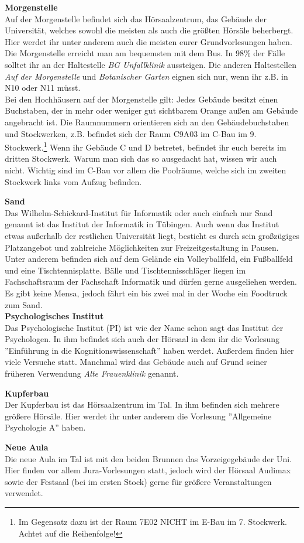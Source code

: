 \textbf{Morgenstelle}\\
Auf der Morgenstelle befindet sich das Hörsaalzentrum, das Gebäude der Universität, welches sowohl die meisten als auch die größten Hörsäle beherbergt. Hier werdet ihr unter anderem auch die meisten eurer Grundvorlesungen haben.\\
Die Morgenstelle erreicht man am bequemsten mit dem Bus. In 98\% der Fälle solltet ihr an der Haltestelle \emph{BG Unfallklinik} aussteigen. Die anderen Haltestellen \emph{Auf der Morgenstelle} und \emph{Botanischer Garten} eignen sich nur, wenn ihr z.B. in N10 oder N11 müsst.\\ Bei den Hochhäusern auf der Morgenstelle gilt: Jedes Gebäude besitzt einen Buchstaben, der in mehr oder weniger gut sichtbarem Orange außen am Gebäude angebracht ist.  Die Raumnummern orientieren sich an den Gebäudebuchstaben und Stockwerken, z.B. befindet sich der Raum C9A03 im C-Bau im 9. Stockwerk.\footnote{Im Gegensatz dazu ist der Raum 7E02 NICHT im E-Bau im 7. Stockwerk. Achtet auf die Reihenfolge!} Wenn ihr Gebäude C und D betretet, befindet ihr euch bereits im dritten Stockwerk. Warum man sich das so ausgedacht hat, wissen wir auch nicht. Wichtig sind im C-Bau vor allem die Poolräume, welche sich im zweiten Stockwerk links vom Aufzug befinden.

\textbf{Sand}\\
Das Wilhelm-Schickard-Institut für Informatik oder auch einfach nur Sand genannt ist das Institut der Informatik in Tübingen. Auch wenn das Institut etwas außerhalb der restlichen Universität liegt, besticht es durch sein großzügiges Platzangebot und zahlreiche Möglichkeiten zur Freizeitgestaltung in Pausen. Unter anderem befinden sich auf dem Gelände ein Volleyballfeld, ein Fußballfeld und eine Tischtennisplatte. Bälle und Tischtennisschläger liegen im Fachschaftsraum der Fachschaft Informatik und dürfen gerne ausgeliehen werden. Es gibt keine Mensa, jedoch fährt ein bis zwei mal in der Woche ein Foodtruck zum Sand.\\

\textbf{Psychologisches Institut}\\
Das Psychologische Institut (PI) ist wie der Name schon sagt das Institut der Psychologen. In ihm befindet sich auch der Hörsaal in dem ihr die Vorlesung ''Einführung in die Kognitionswissenschaft'' haben werdet. Außerdem finden hier viele Versuche statt. Manchmal wird das Gebäude auch auf Grund seiner früheren Verwendung \textit{Alte Frauenklinik} genannt.

\textbf{Kupferbau}\\
Der Kupferbau ist das Hörsaalzentrum im Tal. In ihm befinden sich mehrere größere Hörsäle. Hier werdet ihr unter anderem die Vorlesung ''Allgemeine Psychologie A'' haben.

\textbf{Neue Aula}\\
Die neue Aula im Tal ist mit den beiden Brunnen das Vorzeigegebäude der Uni. Hier finden vor allem Jura-Vorlesungen statt, jedoch wird der Hörsaal Audimax sowie der Festsaal (bei im ersten Stock) gerne für größere Veranstaltungen verwendet.

\vfill
